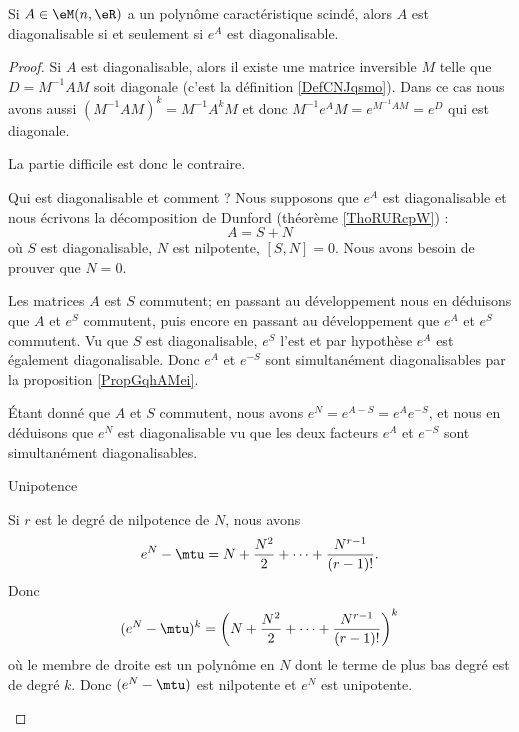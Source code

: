 \begin{proposition}      \label{PropCOMNooIErskN}
    Si \( A\in \eM(n,\eR)\) a un polynôme caractéristique scindé, alors \( A\) est diagonalisable si et seulement si \( e^A\) est diagonalisable.
\end{proposition}

\begin{proof}
    Si \( A\) est diagonalisable, alors il existe une matrice inversible \( M\) telle que \( D=M^{-1}AM\) soit diagonale (c'est la définition \ref{DefCNJqsmo}). Dans ce cas nous avons aussi \( (M^{-1}AM)^k=M^{-1}A^kM\) et donc \( M^{-1}e^AM=e^{M^{-1}AM}=e^D\) qui est diagonale.

    La partie difficile est donc le contraire. 
    
    \begin{subproof}
        \item[Qui est diagonalisable et comment ?]
            Nous supposons que \( e^A\) est diagonalisable et nous écrivons la décomposition de Dunford (théorème \ref{ThoRURcpW}) :
            \begin{equation}
                A=S+N
            \end{equation}
            où \( S\) est diagonalisable, \( N\) est nilpotente, \( [S,N]=0\). Nous avons besoin de prouver que \( N=0\).
    
            Les matrices \( A\) est \( S\) commutent; en passant au développement nous en déduisons que \( A\) et \( e^S\) commutent, puis encore en passant au développement que \( e^A\) et \( e^S\) commutent. Vu que \( S\) est diagonalisable, \( e^S\) l'est et par hypothèse \( e^A\) est également diagonalisable. Donc \( e^A\) et \( e^{-S}\) sont simultanément diagonalisables par la proposition \ref{PropGqhAMei}.

            Étant donné que \( A\) et \( S\) commutent, nous avons \( e^N=e^{A-S}=e^Ae^{-S}\), et nous en déduisons que \( e^N\) est diagonalisable vu que les deux facteurs \( e^A\) et \( e^{-S}\) sont simultanément diagonalisables.

        \item[Unipotence]

            Si \( r\) est le degré de nilpotence de \( N\), nous avons
            \begin{equation}    \label{EqQHjvLZQ}
                e^N-\mtu=N+\frac{ N^2 }{2}+\cdots +\frac{ N^{r-1} }{ (r-1)! }.
            \end{equation}
            Donc
            \begin{equation}
                (e^N-\mtu)^k=\left( N+\frac{ N^2 }{2}+\cdots +\frac{ N^{r-1} }{ (r-1)! } \right)^k
            \end{equation}
            où le membre de droite est un polynôme en \( N\) dont le terme de plus bas degré est de degré \( k\). Donc \( (e^N-\mtu)\) est nilpotente et \( e^N\) est unipotente.


\end{subproof}
\end{proof}
